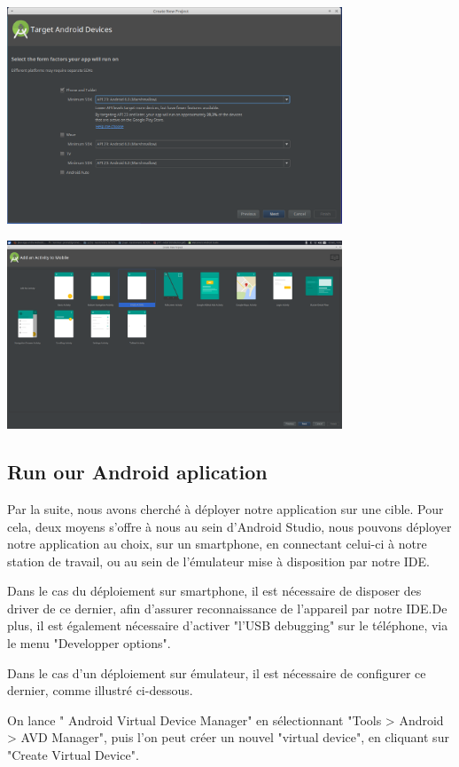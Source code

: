 \documentclass[french,a4paper,12pt]{report}
\begin{document}
\includegraphics[width=10cm]{3Sdk.png}

\includegraphics[width=10cm]{4Activity.png}

\subsection{Run our Android aplication}
Par la suite, nous avons cherché à déployer notre application sur une cible.
Pour cela, deux moyens s'offre à nous au sein d'Android Studio, nous pouvons
déployer notre application au choix, sur un smartphone, en connectant celui-ci
à notre station de travail, ou au sein de l'émulateur mise à disposition par
notre IDE.

Dans le cas du déploiement sur smartphone, il est nécessaire de disposer des
driver de ce dernier, afin d'assurer reconnaissance de l'appareil par notre
IDE.De plus, il est également nécessaire d'activer "l'USB debugging" sur le
téléphone, via le menu "Developper options".

Dans le cas d'un déploiement sur émulateur, il est nécessaire de configurer ce
dernier, comme illustré ci-dessous.

On lance " Android Virtual Device Manager" en sélectionnant "Tools > Android > AVD Manager",
puis l'on peut créer un nouvel "virtual device", en cliquant sur "Create Virtual Device".
\end{document}
